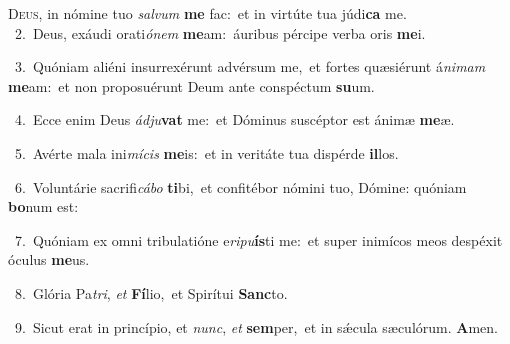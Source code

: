 \lettrine{\initial\textcolor{\initialcolor}{D}}{eus,} in nómine tuo \textit{sal}\-\textit{vum} \textbf{me} fac:~\star et in virtúte tua júdi\textbf{ca} me.\\
{\numbfont\textcolor{\numbcolor}{~2.}}~Deus, exáudi orati\-\textit{ó}\-\textit{nem} \textbf{me}\-am:~\star áuribus pércipe verba oris \textbf{me}\-i.\par
{\numbfont\textcolor{\numbcolor}{~3.}}~Quóniam aliéni insurrexérunt advérsum me,~\dagger et fortes quæsiérunt á\-\textit{ni}\-\textit{mam} \textbf{me}\-am:~\star et non proposuérunt Deum ante conspéctum \textbf{su}\-um.\par
{\numbfont\textcolor{\numbcolor}{~4.}}~Ecce enim Deus \textit{ád}\-\textit{ju}\textbf{vat} me:~\star et Dóminus suscéptor est ánimæ \textbf{me}\-æ.\par
{\numbfont\textcolor{\numbcolor}{~5.}}~Avérte mala ini\-\textit{mí}\-\textit{cis} \textbf{me}\-is:~\star et in veritáte tua dispérde \textbf{il}\-los.\par
{\numbfont\textcolor{\numbcolor}{~6.}}~Voluntárie sacrifi\-\textit{cá}\-\textit{bo} \textbf{ti}\-bi,~\star et confitébor nómini tuo, Dómine: quóniam \textbf{bo}\-num est:\par
{\numbfont\textcolor{\numbcolor}{~7.}}~Quóniam ex omni tribulatióne e\-\textit{ri}\-\textit{pu}\textbf{ís}ti me:~\star et super inimícos meos despéxit óculus \textbf{me}\-us.\par
{\numbfont\textcolor{\numbcolor}{~8.}}~Glória Pa\-\textit{tri}\-, \textit{et} \textbf{Fí}\-lio,~\star et Spirítui \textbf{Sanc}\-to.\par
{\numbfont\textcolor{\numbcolor}{~9.}}~Sicut erat in princípio, et \textit{nunc}\-, \textit{et} \textbf{sem}\-per,~\star et in sǽcula sæculórum. \textbf{A}\-men.\par
